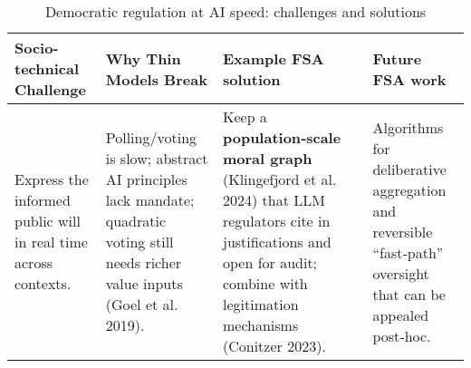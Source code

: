 \begin{table*}[!htbp]
    \centering
    \small
    \begin{tabular}{p{}p{}p{}p{}}
        \toprule
        \textbf{Socio-technical Challenge} & \textbf{Why Thin Models Break} & \textbf{Example FSA solution} & \textbf{Future FSA work} \\
        \midrule
        Express the informed public will in real time across contexts. &
        Polling/voting is slow; abstract AI principles lack mandate; quadratic voting still needs richer value inputs (Goel et al. 2019). &
        Keep a \textbf{population‑scale moral graph} (Klingefjord et al. 2024) that LLM regulators cite in justifications and open for audit; combine with legitimation mechanisms (Conitzer 2023). &
        Algorithms for deliberative aggregation and reversible ``fast‑path'' oversight that can be appealed post‑hoc. \\
        \bottomrule
    \end{tabular}
    \caption{Democratic regulation at AI speed: challenges and solutions}
    \label{tab:democratic-regulation}
\end{table*}